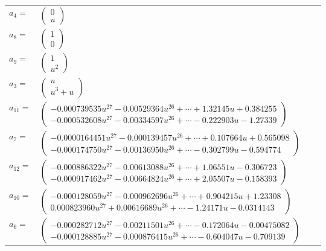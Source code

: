 \documentclass[1p]{elsarticle_modified}
\theoremstyle{definition}
\begin{document}
\begin{tabular}{m{7pt} m{180pt} m{7pt} m{180pt} }
\flushright $a_{4}=$&$\begin{pmatrix}0\\u\end{pmatrix}$ \\
\flushright $a_{8}=$&$\begin{pmatrix}1\\0\end{pmatrix}$ \\
\flushright $a_{9}=$&$\begin{pmatrix}1\\u^2\end{pmatrix}$ \\
\flushright $a_{3}=$&$\begin{pmatrix}u\\u^3+u\end{pmatrix}$ \\
\flushright $a_{11}=$&$\begin{pmatrix}-0.000739535 u^{27}-0.00529364 u^{26}+\cdots+1.32145 u+0.384255\\-0.000532608 u^{27}-0.00334597 u^{26}+\cdots-0.222903 u-1.27339\end{pmatrix}$ \\
\flushright $a_{7}=$&$\begin{pmatrix}-0.0000164451 u^{27}-0.000139457 u^{26}+\cdots+0.107664 u+0.565098\\-0.000174750 u^{27}-0.00136950 u^{26}+\cdots-0.302799 u-0.594774\end{pmatrix}$ \\
\flushright $a_{12}=$&$\begin{pmatrix}-0.000886322 u^{27}-0.00613088 u^{26}+\cdots+1.06551 u-0.306723\\-0.000917462 u^{27}-0.00664824 u^{26}+\cdots+2.05507 u-0.158393\end{pmatrix}$ \\
\flushright $a_{10}=$&$\begin{pmatrix}-0.000128059 u^{27}-0.000962696 u^{26}+\cdots+0.904215 u+1.23308\\0.000823960 u^{27}+0.00616689 u^{26}+\cdots-1.24171 u-0.0314143\end{pmatrix}$ \\
\flushright $a_{6}=$&$\begin{pmatrix}-0.000282712 u^{27}-0.00211501 u^{26}+\cdots-0.172064 u-0.00475082\\-0.000128885 u^{27}-0.000876415 u^{26}+\cdots-0.604047 u-0.709139\end{pmatrix}$ \\

\end{tabular}
\end{document}

